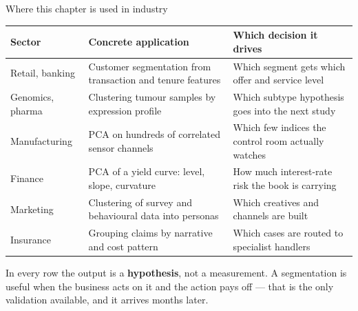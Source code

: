 \documentclass[aspectratio=169,11pt]{beamer}
\begin{document}
\begin{frame}{Where this chapter is used in industry}
  \scriptsize
  \begin{center}
  \begin{tabular}{@{}p{2.6cm}p{5.2cm}p{4.6cm}@{}}
    \toprule
    \textbf{Sector} & \textbf{Concrete application} & \textbf{Which decision it drives} \\
    \midrule
    Retail, banking & Customer segmentation from transaction and tenure features &
      Which segment gets which offer and service level \\
    Genomics, pharma & Clustering tumour samples by expression profile &
      Which subtype hypothesis goes into the next study \\
    Manufacturing & PCA on hundreds of correlated sensor channels &
      Which few indices the control room actually watches \\
    Finance & PCA of a yield curve: level, slope, curvature &
      How much interest-rate risk the book is carrying \\
    Marketing & Clustering of survey and behavioural data into personas &
      Which creatives and channels are built \\
    Insurance & Grouping claims by narrative and cost pattern &
      Which cases are routed to specialist handlers \\
    \bottomrule
  \end{tabular}
  \end{center}
  \begin{industry}
    In every row the output is a \textbf{hypothesis}, not a measurement. A segmentation is
    useful when the business acts on it and the action pays off --- that is the only
    validation available, and it arrives months later.
  \end{industry}
\end{frame}
\end{document}
